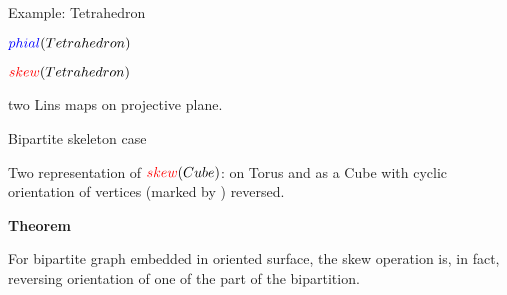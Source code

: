 \documentclass[%
pdf,
colorBG,
slideColor,
]{prosper}
\begin{document}
\begin{slide}{Example: Tetrahedron}
\begin{center}
\begin{minipage}{50mm}
\par
$\textcolor{blue}{phial}(Tetrahedron)$
\end{minipage}
\begin{minipage}{50mm}
\par
$\textcolor{red}{skew}(Tetrahedron)$
\end{minipage}
\end{center}
\begin{center}
two Lins maps on projective plane.
\end{center}

\end{slide}





\begin{slide}{Bipartite skeleton case}

\begin{center}
\begin{minipage}{50mm}
\end{minipage}
\begin{minipage}{50mm}
\end{minipage}
\end{center}
\begin{center}
Two representation of $\textcolor{red}{skew}(Cube)$: on Torus and as a Cube with cyclic orientation of vertices (marked by ) reversed.
\end{center}
\hspace{0.7cm}
{\it 

{\bf Theorem}

For bipartite graph embedded in oriented surface, the skew operation is, in fact, reversing orientation of one of the part of the bipartition.

}




\end{slide}
\end{document}
